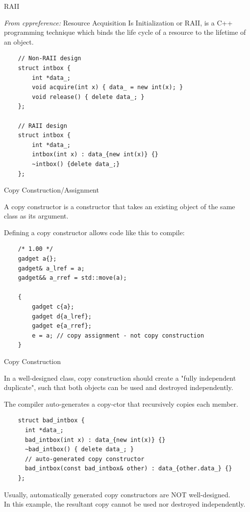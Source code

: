 \begin{frame}[fragile]{RAII}
  \begin{sqt:definition}
  \emph{From cppreference:} Resource Acquisition Is Initialization or RAII, is a C++ programming technique which binds the life cycle of a resource to the lifetime of an object. 
  \end{sqt:definition}

  \begin{verbatim}
    // Non-RAII design
    struct intbox {
        int *data_;
        void acquire(int x) { data_ = new int(x); }
        void release() { delete data_; }
    };

    // RAII design
    struct intbox {
        int *data_;
        intbox(int x) : data_{new int(x)} {}
        ~intbox() {delete data_;}
    };
  \end{verbatim}
\end{frame}

\begin{frame}[fragile]{Copy Construction/Assignment}
  \begin{sqt:definition}
    A copy constructor is a constructor that takes an existing object of the same class as its argument.
  \end{sqt:definition}
  Defining a copy constructor allows code like this to compile:
  \begin{verbatim}
    /* 1.00 */
    gadget a{};
    gadget& a_lref = a;
    gadget&& a_rref = std::move(a);

    {
        gadget c{a};
        gadget d{a_lref};
        gadget e{a_rref};
        e = a; // copy assignment - not copy construction
    }
  \end{verbatim}
\end{frame}

\begin{frame}[fragile]{Copy Construction}
  \begin{sqt:result}
    In a well-designed class, copy construction should create a "fully independent duplicate", such that
    both objects can be used and destroyed independently.
  \end{sqt:result}

  The compiler auto-generates a copy-ctor that recursively copies each member.
  \begin{verbatim}
    struct bad_intbox {
      int *data_;
      bad_intbox(int x) : data_{new int(x)} {}
      ~bad_intbox() { delete data_; }
      // auto-generated copy constructor
      bad_intbox(const bad_intbox& other) : data_{other.data_} {}
    };
  \end{verbatim}
  Usually, automatically generated copy constructors are NOT well-designed.\\
  In this example, the resultant copy cannot be used nor destroyed independently.
\end{frame}

